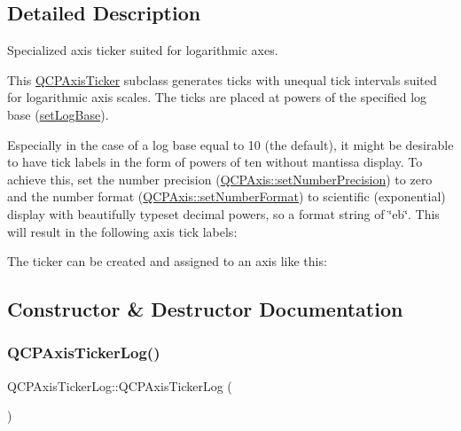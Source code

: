 \subsection{Detailed Description}
Specialized axis ticker suited for logarithmic axes. 



This \hyperlink{class_q_c_p_axis_ticker}{Q\+C\+P\+Axis\+Ticker} subclass generates ticks with unequal tick intervals suited for logarithmic axis scales. The ticks are placed at powers of the specified log base (\hyperlink{class_q_c_p_axis_ticker_log_ac6e3b4e03baea3816f898869ab9751ef}{set\+Log\+Base}).

Especially in the case of a log base equal to 10 (the default), it might be desirable to have tick labels in the form of powers of ten without mantissa display. To achieve this, set the number precision (\hyperlink{class_q_c_p_axis_a21dc8023ad7500382ad9574b48137e63}{Q\+C\+P\+Axis\+::set\+Number\+Precision}) to zero and the number format (\hyperlink{class_q_c_p_axis_ae585a54dc2aac662e90a2ca82f002590}{Q\+C\+P\+Axis\+::set\+Number\+Format}) to scientific (exponential) display with beautifully typeset decimal powers, so a format string of {\ttfamily \char`\"{}eb\char`\"{}}. This will result in the following axis tick labels\+:



The ticker can be created and assigned to an axis like this\+: 
\begin{DoxyCodeInclude}
\end{DoxyCodeInclude}


\subsection{Constructor \& Destructor Documentation}
\mbox{\label{class_q_c_p_axis_ticker_log_af3cb86ea5eef2023c0b96b5260c4cbdf}} 
\subsubsection{\texorpdfstring{Q\+C\+P\+Axis\+Ticker\+Log()}{QCPAxisTickerLog()}}
{\footnotesize\ttfamily Q\+C\+P\+Axis\+Ticker\+Log\+::\+Q\+C\+P\+Axis\+Ticker\+Log (\begin{DoxyParamCaption}{ }\end{DoxyParamCaption})}

